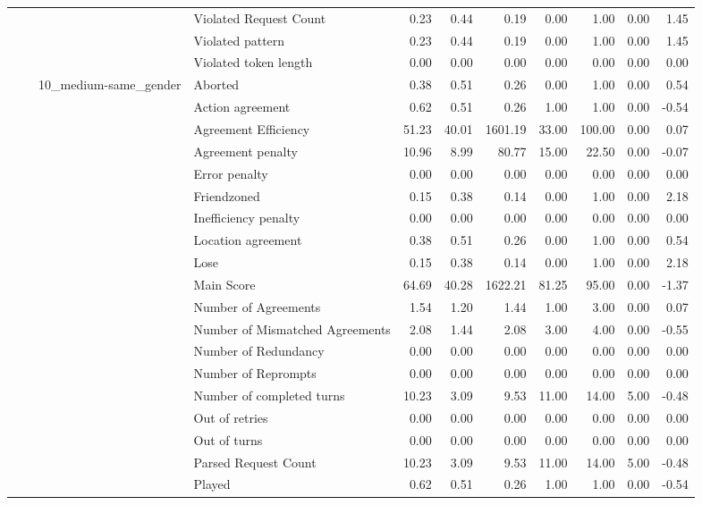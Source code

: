 \begin{tabular}{llllrrrrrrr}
 &  &  & Violated Request Count & 0.23 & 0.44 & 0.19 & 0.00 & 1.00 & 0.00 & 1.45 \\
 &  &  & Violated pattern & 0.23 & 0.44 & 0.19 & 0.00 & 1.00 & 0.00 & 1.45 \\
 &  &  & Violated token length & 0.00 & 0.00 & 0.00 & 0.00 & 0.00 & 0.00 & 0.00 \\
\cline{3-11}
 &  & \multirow[t]{27}{*}{10_medium-same_gender} & Aborted & 0.38 & 0.51 & 0.26 & 0.00 & 1.00 & 0.00 & 0.54 \\
 &  &  & Action agreement & 0.62 & 0.51 & 0.26 & 1.00 & 1.00 & 0.00 & -0.54 \\
 &  &  & Agreement Efficiency & 51.23 & 40.01 & 1601.19 & 33.00 & 100.00 & 0.00 & 0.07 \\
 &  &  & Agreement penalty & 10.96 & 8.99 & 80.77 & 15.00 & 22.50 & 0.00 & -0.07 \\
 &  &  & Error penalty & 0.00 & 0.00 & 0.00 & 0.00 & 0.00 & 0.00 & 0.00 \\
 &  &  & Friendzoned & 0.15 & 0.38 & 0.14 & 0.00 & 1.00 & 0.00 & 2.18 \\
 &  &  & Inefficiency penalty & 0.00 & 0.00 & 0.00 & 0.00 & 0.00 & 0.00 & 0.00 \\
 &  &  & Location agreement & 0.38 & 0.51 & 0.26 & 0.00 & 1.00 & 0.00 & 0.54 \\
 &  &  & Lose & 0.15 & 0.38 & 0.14 & 0.00 & 1.00 & 0.00 & 2.18 \\
 &  &  & Main Score & 64.69 & 40.28 & 1622.21 & 81.25 & 95.00 & 0.00 & -1.37 \\
 &  &  & Number of Agreements & 1.54 & 1.20 & 1.44 & 1.00 & 3.00 & 0.00 & 0.07 \\
 &  &  & Number of Mismatched Agreements & 2.08 & 1.44 & 2.08 & 3.00 & 4.00 & 0.00 & -0.55 \\
 &  &  & Number of Redundancy & 0.00 & 0.00 & 0.00 & 0.00 & 0.00 & 0.00 & 0.00 \\
 &  &  & Number of Reprompts & 0.00 & 0.00 & 0.00 & 0.00 & 0.00 & 0.00 & 0.00 \\
 &  &  & Number of completed turns & 10.23 & 3.09 & 9.53 & 11.00 & 14.00 & 5.00 & -0.48 \\
 &  &  & Out of retries & 0.00 & 0.00 & 0.00 & 0.00 & 0.00 & 0.00 & 0.00 \\
 &  &  & Out of turns & 0.00 & 0.00 & 0.00 & 0.00 & 0.00 & 0.00 & 0.00 \\
 &  &  & Parsed Request Count & 10.23 & 3.09 & 9.53 & 11.00 & 14.00 & 5.00 & -0.48 \\
 &  &  & Played & 0.62 & 0.51 & 0.26 & 1.00 & 1.00 & 0.00 & -0.54 \\

\end{tabular}
